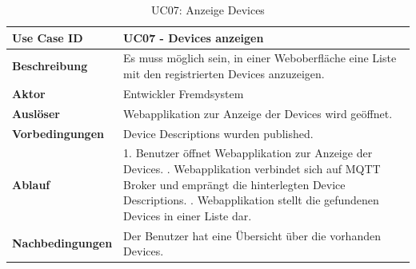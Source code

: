 \begin{table}[H]
\begin{tabularx}{\textwidth}{|l|X|}

 \hline
 {\bf Use Case ID }    & UC07 - Devices anzeigen \\  \hline
 {\bf Beschreibung }   & Es muss möglich sein, in einer Weboberfläche eine Liste mit den registrierten Devices anzuzeigen. \\ \hline
 {\bf Aktor }          & Entwickler Fremdsystem \\ \hline
 {\bf Auslöser }       & Webapplikation zur Anzeige der Devices wird geöffnet. \\ \hline
 {\bf Vorbedingungen } & Device Descriptions wurden published. \\ \hline
 {\bf Ablauf }         & 
     1. Benutzer öffnet Webapplikation zur Anzeige der Devices. \newline
     2. Webapplikation verbindet sich auf MQTT Broker und emprängt die hinterlegten Device Descriptions. \newline
     3. Webapplikation stellt die gefundenen Devices in einer Liste dar. \\ \hline
 {\bf Nachbedingungen} & Der Benutzer hat eine Übersicht über die vorhanden Devices. \\ \hline
  
\end{tabularx}
\caption{UC07: Anzeige Devices}
\end{table}

